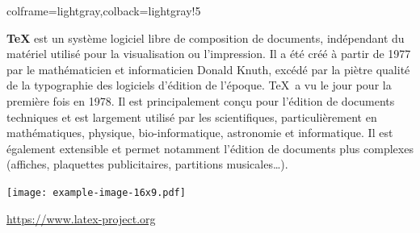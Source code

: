 \documentclass[11pt,a4paper]{ltxdoc}
\begin{document}
\begin{tcblisting}{colframe=lightgray,colback=lightgray!5}
\begin{BlueSkyPost}[width=12cm,account={\symbol{64}TeX.bluesky.social}]
\textbf{TeX} est un système logiciel libre de composition de documents, indépendant du matériel utilisé pour la visualisation ou l'impression. Il a été créé à partir de 1977 par le mathématicien et informaticien Donald Knuth, excédé par la piètre qualité de la typographie des logiciels d'édition de l'époque. \TeX\ a vu le jour pour la première fois en 1978. Il est principalement conçu pour l'édition de documents techniques et est largement utilisé par les scientifiques, particulièrement en mathématiques, physique, bio-informatique, astronomie et informatique. Il est également extensible et permet notamment l'édition de documents plus complexes (affiches, plaquettes publicitaires, partitions musicales\ldots).

\smallskip

\hfill\texttt{[image: example-image-16x9.pdf]}\hfill~

\smallskip

\url{https://www.latex-project.org}
\end{BlueSkyPost}
\end{tcblisting}
\end{document}
